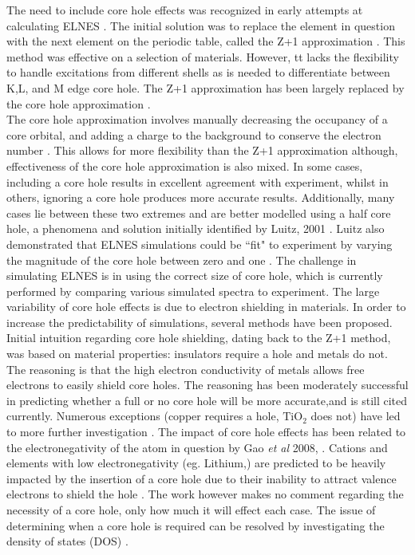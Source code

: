 The need to include core hole effects was recognized in early attempts at calculating ELNES  \cite{lee_new_1977}.  The initial solution was to replace the element in question with the next element on the periodic table, called the Z+1 approximation \cite{lee_new_1977}.  This method was effective on a selection of materials.  However, tt lacks the flexibility to handle excitations from different shells as is needed to differentiate between K,L, and M edge core hole.  The Z+1 approximation has been largely replaced by the core hole approximation \cite{hebert_practical_2007}. \\

The core hole approximation involves manually decreasing the occupancy of a core orbital, and adding a charge to the background to conserve the electron number \cite{wien2k}. This allows for more flexibility than the Z+1 approximation although, effectiveness of the core hole approximation is also mixed.  In some cases, including a core hole results in excellent agreement with experiment, whilst in others, ignoring a core hole produces more accurate results. Additionally, many cases lie between these two extremes and are better modelled using a half core hole, a phenomena and solution initially identified by Luitz, 2001 \cite{luitz_partial_2001}. Luitz also demonstrated that ELNES simulations could be ``fit" to experiment by varying the magnitude of the core hole between zero and one \cite{luitz_partial_2001}.  The challenge in simulating ELNES is in using the correct size of core hole, which is currently performed by comparing various simulated spectra to experiment.  The large variability of core hole effects is due to electron shielding in materials.  In order to increase the predictability of simulations, several methods have been proposed. \\

Initial intuition regarding core hole shielding, dating back to the Z+1 method, was based on material properties: insulators require a hole and metals do not.  The reasoning is that the high electron conductivity of metals allows free electrons to easily shield core holes. The reasoning has been moderately successful in predicting whether a full or no core hole will be more accurate,and is still cited currently. Numerous exceptions (copper requires a hole, $ \mathrm{TiO_2} $ does not) have led to more further investigation \cite{luitz_partial_2001, mauchamp_core-hole_2009,gao_theory_2008,soininen_scheme_2001}.  The impact of core hole effects has been related to the electronegativity of the atom in question by Gao \textit{et al} 2008, \cite{gao_theory_2008}.  Cations and elements with low electronegativity (eg. Lithium,) are predicted to be heavily impacted by the insertion of a core hole due to their inability to attract valence electrons to shield the hole \cite{gao_theory_2008}. The work however makes no comment regarding the necessity of a core hole, only how much it will effect each case.  The issue of determining when a core hole is required can be resolved by investigating the density of states (DOS) \cite{mauchamp_core-hole_2009}.\\

